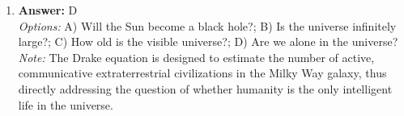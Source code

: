\documentclass[12pt]{article}
\begin{document}
\begin{enumerate}[label=\arabic*.]
\\ \textit{Note:} The correct answer is based on the fact that Mars' thin atmosphere, with a surface pressure less than 1\% of Earth's, is insufficient to retain heat effectively, despite its high carbon dioxide content.
\item \textbf{Answer:} D
\\ \textit{Options:} A) Will the Sun become a black hole?; B) Is the universe infinitely large?; C) How old is the visible universe?; D) Are we alone in the universe?
\\ \textit{Note:} The Drake equation is designed to estimate the number of active, communicative extraterrestrial civilizations in the Milky Way galaxy, thus directly addressing the question of whether humanity is the only intelligent life in the universe.
\end{enumerate}
\end{document}
